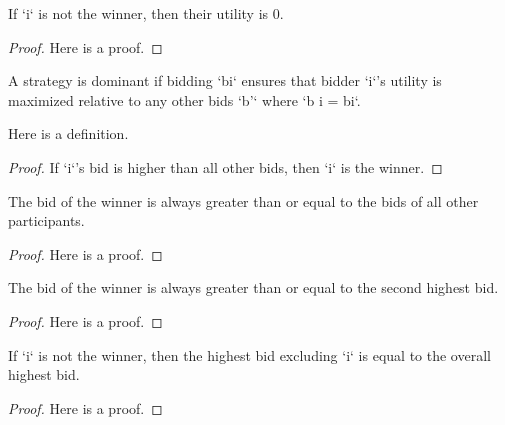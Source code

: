 \begin{lemma}\label{utility_loser}
    \leanok
    If `i` is not the winner, then their utility is 0.
\end{lemma}
\begin{proof}
    Here is a proof.
\end{proof}

\begin{definition}\label{dominant}
    \leanok
    A strategy is dominant if bidding `bi` ensures that bidder `i`'s utility is maximized relative to any other bids `b'` where `b i = bi`.
\end{definition}


\begin{lemma}\label{gt_wins}
    \leanok
    Here is a definition.
\end{lemma}
\begin{proof}
    If `i`'s bid is higher than all other bids, then `i` is the winner.
\end{proof}



\begin{lemma}\label{b_winner_max}
    \leanok
    The bid of the winner is always greater than or equal to the bids of all other participants.
\end{lemma}
\begin{proof}
    Here is a proof.
\end{proof}

\begin{lemma}\label{b_winner}
    \leanok
    The bid of the winner is always greater than or equal to the second highest bid.
\end{lemma}
\begin{proof}
    Here is a proof.
\end{proof}

\begin{lemma}\label{b_loser_max}
    \leanok
    If `i` is not the winner, then the highest bid excluding `i` is equal to the overall highest bid.
\end{lemma}
\begin{proof}
    Here is a proof.
\end{proof}

